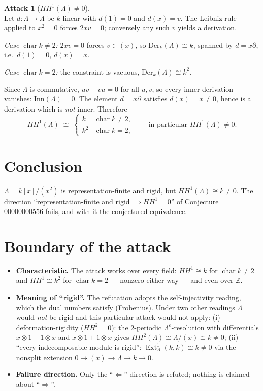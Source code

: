 \documentclass[11pt]{article}
\theoremstyle{definition}
\newtheorem{attack}{Attack}
\begin{document}
\begin{attack}[$HH^1(\Lambda)\neq 0$]\leavevmode\\
Let $d\colon \Lambda\to\Lambda$ be $k$-linear with $d(1)=0$ and
$d(x)=v$. The Leibniz rule applied to $x^2=0$ forces $2xv=0$; conversely any
such $v$ yields a derivation.

\emph{Case $\operatorname{char}k\neq 2$:} $2xv=0$ forces $v\in(x)$, so
$\mathrm{Der}_k(\Lambda)\cong k$, spanned by $d=x\partial$, i.e.\
$d(1)=0$, $d(x)=x$.

\emph{Case $\operatorname{char}k=2$:} the constraint is vacuous,
$\mathrm{Der}_k(\Lambda)\cong k^2$.

Since $\Lambda$ is commutative, $uv-vu=0$ for all $u,v$, so every inner
derivation vanishes: $\mathrm{Inn}(\Lambda)=0$. The element
$d=x\partial$ satisfies $d(x)=x\neq 0$, hence is a derivation which is
\emph{not} inner. Therefore
\[
HH^1(\Lambda)\;\cong\;
\begin{cases}
k & \operatorname{char}k\neq 2,\\
k^2 & \operatorname{char}k=2,
\end{cases}
\qquad\text{in particular } HH^1(\Lambda)\neq 0.
\]
\end{attack}

\section{Conclusion}

$\Lambda=k[x]/(x^2)$ is representation-finite and rigid, but
$HH^1(\Lambda)\cong k\neq 0$. The direction
``representation-finite and rigid $\Rightarrow HH^1=0$'' of Conjecture
00000000556 fails, and with it the conjectured equivalence.

\section{Boundary of the attack}

\begin{itemize}
\item \textbf{Characteristic.} The attack works over every field: $HH^1\cong k$
  for $\operatorname{char}k\neq 2$ and $HH^1\cong k^2$ for
  $\operatorname{char}k=2$ --- nonzero either way --- and even over $\mathbb{Z}$.
\item \textbf{Meaning of ``rigid''.} The refutation adopts the
  self-injectivity reading, which the dual numbers satisfy (Frobenius).
  Under two other readings $\Lambda$ would \emph{not} be rigid and this
  particular attack would not apply:
  (i) deformation-rigidity ($HH^2=0$): the $2$-periodic $\Lambda^e$-resolution
  with differentials $x\otimes1-1\otimes x$ and $x\otimes1+1\otimes x$ gives
  $HH^2(\Lambda)\cong\Lambda/(x)\cong k\neq 0$;
  (ii) ``every indecomposable module is rigid'':
  $\operatorname{Ext}^1_\Lambda(k,k)\cong k\neq 0$ via the nonsplit extension
  $0\to(x)\to\Lambda\to k\to 0$.
\item \textbf{Failure direction.} Only the ``$\Leftarrow$'' direction is
  refuted; nothing is claimed about ``$\Rightarrow$''.
\end{itemize}
\end{document}
